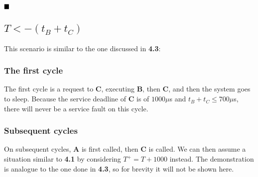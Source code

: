 \documentclass{article}
\begin{document}
$\hfill\blacksquare$

\subsection{$T < -(t_B + t_C)$}

This scenario is similar to the one discussed in \textbf{4.3}:

\subsubsection{The first cycle}

The first cycle is a request to \textbf{C}, executing \textbf{B}, then \textbf{C}, and then the system goes to sleep. Because the service deadline of \textbf{C} is of $1000\mu$s and $t_B + t_C \le 700\mu$s, there will never be a service fault on this cycle.

\subsubsection{Subsequent cycles}

On subsequent cycles, \textbf{A} is first called, then \textbf{C} is called. We can then assume a situation similar to \textbf{4.1} by considering $T^+ = T + 1000$ instead. The demonstration is analogue to the one done in \textbf{4.3}, so for brevity it will not be shown here.
\end{document}
